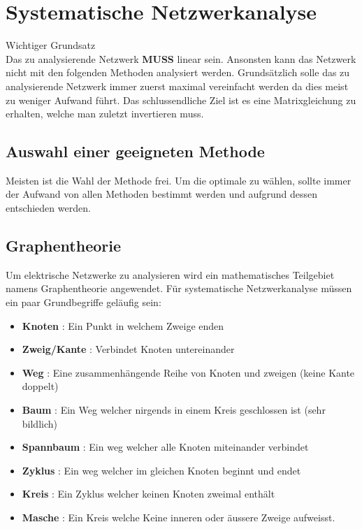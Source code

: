 \section{Systematische Netzwerkanalyse}

{\color{red}Wichtiger Grundsatz}\\
Das zu analysierende Netzwerk \textbf{MUSS} linear sein. 
Ansonsten kann das Netzwerk nicht mit den folgenden Methoden analysiert werden.
Grundsätzlich solle das zu analysierende Netzwerk immer zuerst maximal vereinfacht werden da dies meist zu weniger Aufwand führt. 
Das schlussendliche Ziel ist es eine Matrixgleichung zu erhalten, welche man zuletzt invertieren muss.

\subsection{Auswahl einer geeigneten Methode}

Meisten ist die Wahl der Methode frei. 
Um die optimale zu wählen, sollte immer der Aufwand von allen Methoden bestimmt werden und aufgrund dessen entschieden werden.

\subsection{Graphentheorie}

Um elektrische Netzwerke zu analysieren wird ein mathematisches Teilgebiet namens Graphentheorie angewendet.
Für systematische Netzwerkanalyse müssen ein paar Grundbegriffe geläufig sein:

\begin{itemize}
    \item \textbf{Knoten} : Ein Punkt in welchem Zweige enden
    \item \textbf{Zweig/Kante} : Verbindet Knoten untereinander
    \item \textbf{Weg} : Eine zusammenhängende Reihe von Knoten und zweigen (keine Kante doppelt)
    \item \textbf{Baum} : Ein Weg welcher nirgends in einem Kreis geschlossen ist (sehr bildlich)
    \item \textbf{Spannbaum} : Ein weg welcher alle Knoten miteinander verbindet
    \item \textbf{Zyklus} : Ein weg welcher im gleichen Knoten beginnt und endet
    \item \textbf{Kreis} : Ein Zyklus welcher keinen Knoten zweimal enthält
    \item \textbf{Masche} : Ein Kreis welche Keine inneren oder äussere Zweige aufweisst.
\end{itemize}

